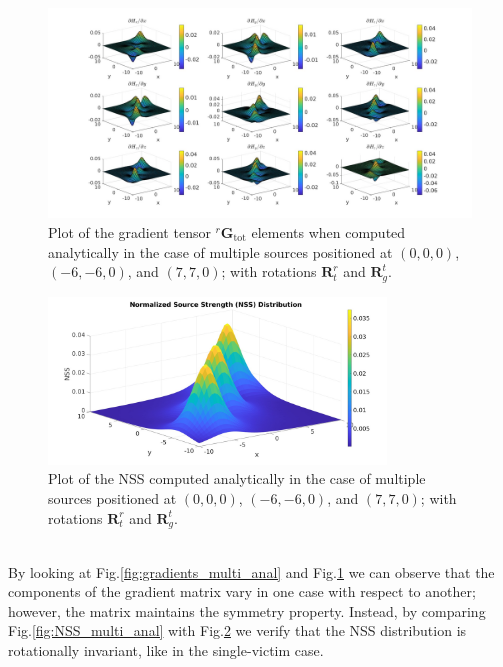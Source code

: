 \documentclass[main]{subfiles}
\begin{document}
\begin{figure}
\hspace*{-0.2\textwidth}
\includegraphics[width=1.4\textwidth]{images/gradients_rotated_multi_anal.jpg}
\caption{Plot of the gradient tensor ${}^r \mathbf{G}_{\text{tot}}$ elements
when computed analytically in the case of multiple sources positioned at  $(0,0,0)$, $(-6,-6,0)$, and $(7,7,0)$;
with rotations $\mathbf{R}^r_t$ and $\mathbf{R}_g^t$. }
\label{fig:gradients_rotated_multi_anal}
\end{figure}

\begin{figure}
\centering
\includegraphics[width=0.8\textwidth]{images/NSS_rotated_multi_anal.jpg}
\caption{Plot of the NSS computed analytically in the case of multiple sources positioned at  $(0,0,0)$, $(-6,-6,0)$, and $(7,7,0)$;
with rotations $\mathbf{R}^r_t$ and $\mathbf{R}_g^t$.}
\label{fig:NSS_rotated_multi_anal}
\end{figure}

\noindent\\
By looking at Fig.\ref{fig:gradients_multi_anal} and Fig.\ref{fig:gradients_rotated_multi_anal}
we can observe that the components of the gradient matrix vary in one case with respect to another;
however, the matrix maintains the symmetry property.
Instead, by comparing Fig.\ref{fig:NSS_multi_anal} with Fig.\ref{fig:NSS_rotated_multi_anal}
we verify that the NSS distribution is rotationally invariant, like in the single-victim case.
\end{document}
